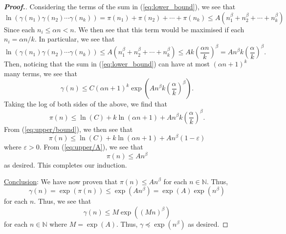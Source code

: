 \documentclass[11pt,a4paper,reqno]{amsart}
\theoremstyle{plain}
\theoremstyle{definition}
\theoremstyle{definition}
\newenvironment{myproof}{\begin{proof}[\normalfont\bfseries Proof.]}{\end{proof}}
\renewcommand\leq\leqslant
\renewcommand\geq\geqslant
\begin{document}
\begin{myproof}
Considering the terms of the sum in (\ref{eq:lower_bound}), we see that
\[
  \ln(\gamma(n_1)\gamma(n_2)\cdots\gamma(n_k))
  =
  \pi(n_1) + \pi(n_2) + \cdots + \pi(n_k)
  \leq
  A \left(n_1^\beta + n_2^\beta + \cdots + n_k^\beta\right)
\]
Since each $n_i \leq \alpha n < n$.
We then see that this term would be maximised if each $n_i = \alpha n /k$.
In particular, we see that
\[
  \ln(\gamma(n_1)\gamma(n_2)\cdots\gamma(n_k))
  \leq
  A \left(n_1^\beta + n_2^\beta + \cdots + n_k^\beta\right)
  \leq
  A k \left(\frac{\alpha n}{k}\right)^\beta
  =
  A n^\beta  k \left(\frac{\alpha}{k}\right)^\beta.
\]
Then, noticing that the sum in (\ref{eq:lower_bound}) can have at most $(\alpha n+1)^k$ many terms, we see that
\[
  \gamma(n)
  \leq
  C (\alpha n+1)^k \exp\left(A n^\beta  k \left(\frac{\alpha}{k}\right)^\beta\right).
\]
Taking the log of both sides of the above, we find that
\[
  \pi(n)
  \leq
  \ln(C) + k \ln(\alpha n+1) +A n^\beta  k \left(\frac{\alpha}{k}\right)^\beta. 
\]
From (\ref{eq:upper/bound}), we then see that
\[
  \pi(n)
  \leq
  \ln(C) + k \ln(\alpha n+1) +A n^\beta  (1-\varepsilon) 
\]
where $\varepsilon>0$.
From (\ref{eq:upper/A}), we see that
\[
  \pi(n)
  \leq
  A n^\beta
\]
as desired. This completes our induction.

\medskip
\noindent
\underline{Conclusion}:
%
We have now proven that $\pi(n) \leq A n^\beta$ for each $n \in \mathbb N$.
Thus,
\[
  \gamma(n) = \exp(\pi(n)) \leq \exp(An^\beta) = \exp(A) \exp(n^\beta)
\]
for each $n$.
Thus, we see that
\[
  \gamma(n) \leq M \exp((Mn)^\beta)
\]
for each $n \in \mathbb N$ where $M = \exp(A)$.
Thus, $\gamma \preccurlyeq \exp(n^\beta)$ as desired.
\end{myproof}
%
%
%
\end{document}
